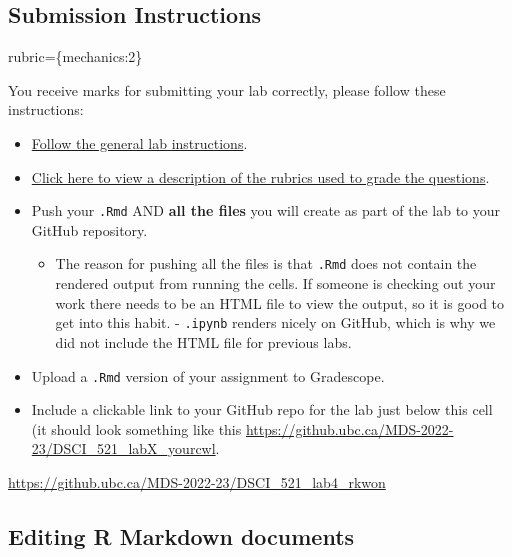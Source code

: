 \documentclass[
]{article}
\providecommand{\tightlist}{%
  \setlength{\itemsep}{0pt}\setlength{\parskip}{0pt}}
\begin{document}
\begin{alert alert-info}
\hypertarget{submission-instructions}{%
\subsection{Submission Instructions}\label{submission-instructions}}

rubric=\{mechanics:2\}

You receive marks for submitting your lab correctly, please follow these
instructions:

\begin{itemize}
\tightlist
\item
  \href{https://ubc-mds.github.io/resources_pages/general_lab_instructions/}{Follow
  the general lab instructions}.
\item
  \href{https://github.com/UBC-MDS/public/tree/master/rubric}{Click here
  to view a description of the rubrics used to grade the questions}.
\item
  Push your \texttt{.Rmd} AND \textbf{all the files} you will create as
  part of the lab to your GitHub repository.

  \begin{itemize}
  \tightlist
  \item
    The reason for pushing all the files is that \texttt{.Rmd} does not
    contain the rendered output from running the cells. If someone is
    checking out your work there needs to be an HTML file to view the
    output, so it is good to get into this habit. - \texttt{.ipynb}
    renders nicely on GitHub, which is why we did not include the HTML
    file for previous labs.
  \end{itemize}
\item
  Upload a \texttt{.Rmd} version of your assignment to Gradescope.
\item
  Include a clickable link to your GitHub repo for the lab just below
  this cell (it should look something like this
  \url{https://github.ubc.ca/MDS-2022-23/DSCI_521_labX_yourcwl}.
\end{itemize}
\end{alert alert-info}

\url{https://github.ubc.ca/MDS-2022-23/DSCI_521_lab4_rkwon}

\hypertarget{editing-r-markdown-documents}{%
\subsection{Editing R Markdown
documents}\label{editing-r-markdown-documents}}
\end{document}
